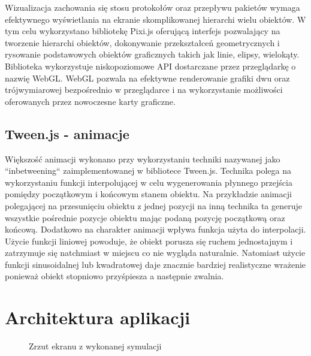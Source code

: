 Wizualizacja zachowania się stosu protokołów oraz przepływu pakietów wymaga efektywnego wyświetlania na ekranie skomplikowanej hierarchi wielu obiektów. W tym celu wykorzystano bibliotekę Pixi.js oferującą interfejs pozwalający na tworzenie hierarchi obiektów, dokonywanie przekształceń geometrycznych i rysowanie podstawowych obiektów graficznych takich jak linie, elipsy, wielokąty. Biblioteka wykorzystuje niskopoziomowe API dostarczane przez przeglądarkę o nazwię WebGL. WebGL pozwala na efektywne renderowanie grafiki dwu oraz trójwymiarowej bezpośrednio w przeglądarce i na wykorzystanie możliwości oferowanych przez nowoczesne karty graficzne.

\subsection{Tween.js - animacje}

Większość animacji wykonano przy wykorzystaniu techniki nazywanej jako ``inbetweening`` zaimplementowanej w bibliotece Tween.js. Technika polega na wykorzystaniu funkcji interpolującej w celu wygenerowania płynnego przejścia pomiędzy początkowym i końcowym stanem obiektu. 
Na przykładzie animacji polegającej na przesunięciu obiektu z jednej pozycji na inną technika ta generuje wszystkie pośrednie pozycje obiektu mając podaną pozycję początkową oraz końcową. Dodatkowo na charakter animacji wpływa funkcja użyta do interpolacji. Użycie funkcji liniowej powoduje, że obiekt porusza się ruchem jednostajnym i zatrzymuje się natchmiast w miejscu co nie wygląda naturalnie. Natomiast użycie funkcji sinusoidalnej lub kwadratowej daje znacznie bardziej realistyczne wrażenie ponieważ obiekt stopniowo przyśpiesza a następnie zwalnia.

\section{Architektura aplikacji}

\begin{figure}[ht]
	\centerline{}
	\caption{Zrzut ekranu z wykonanej symulacji}
	\label{fig:simulation}
\end{figure}


